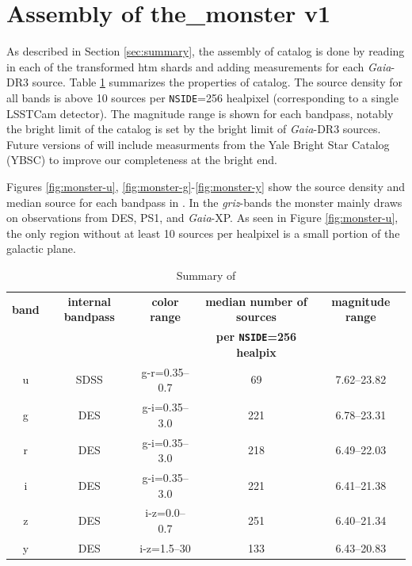 \section{Assembly of the\_monster v1}
\label{sec:assembly}
As described in Section \ref{sec:summary}, the assembly of \monster catalog is done by reading in each of the transformed htm shards and adding measurements for each \textit{Gaia}-DR3 source.
Table \ref{tab:summary} summarizes the properties of \monster catalog.
The source density for all bands is above 10 sources per \texttt{NSIDE}=256 healpixel (corresponding to a single LSSTCam detector).
The magnitude range is shown for each bandpass, notably the bright limit of the catalog is set by the bright limit of \emph{Gaia}-DR3 sources.
Future versions of \monster will include measurments from the Yale Bright Star Catalog (YBSC) to improve our completeness at the bright end.

Figures \ref{fig:monster-u}, \ref{fig:monster-g}-\ref{fig:monster-y} show the source density and median source for each bandpass in \monster.
In the \emph{griz}-bands the monster mainly draws on observations from DES, PS1, and \emph{Gaia}-XP.
As seen in Figure \ref{fig:monster-u}, the only region without at least 10 sources per healpixel is a small portion of the galactic plane. 

\begin{table}[htbp]
    \centering
    \label{tab:summary}
    
    \begin{tabular}{|c | c | c | c | c |}
        \hline
        \textbf{band} & \textbf{internal bandpass} & \textbf{color range} & \textbf{median number of sources } & \textbf{magnitude range} \\
                      &                            &                      & \textbf{per \texttt{NSIDE}=256 healpix}& \\
        \hline
        u             &  SDSS                      & g-r=0.35--0.7        & 69                      & 7.62--23.82                   \\
        g             & DES                        & g-i=0.35--3.0        & 221                     & 6.78--23.31                 \\
        r             & DES                        & g-i=0.35--3.0        & 218                     & 6.49--22.03                   \\
        i             & DES                        & g-i=0.35--3.0        & 221                     & 6.41--21.38                    \\
        z             & DES                        & i-z=0.0--0.7         & 251                     & 6.40--21.34                   \\
        y             & DES                        & i-z=1.5--30          & 133                     & 6.43--20.83                    \\
        \hline
    \end{tabular}
    \caption{Summary of \monster}
\end{table}


